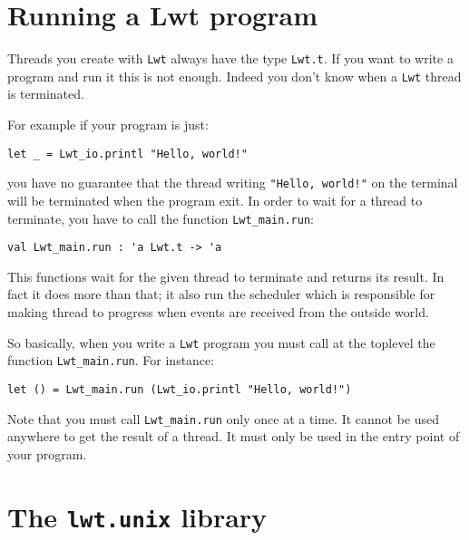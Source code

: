 \section{ Running a Lwt program }

Threads you create with {\tt Lwt} always have the type
{\tt Lwt.t}. If you want to write a program and run it this is not
enough. Indeed you don't know when a {\tt Lwt} thread is terminated.



For example if your program is just:



\lstset{language=[Objective]Caml}\begin{lstlisting}
let _ = Lwt_io.printl "Hello, world!"

\end{lstlisting}
you have no guarantee that the thread writing {\tt "Hello, world!"}
on the terminal will be terminated when the program exit. In order
to wait for a thread to terminate, you have to call the function
{\tt Lwt\_main.run}:



\lstset{language=[Objective]Caml}\begin{lstlisting}
val Lwt_main.run : 'a Lwt.t -> 'a

\end{lstlisting}
This functions wait for the given thread to terminate and returns
its result. In fact it does more than that; it also run the
scheduler which is responsible for making thread to progress when
events are received from the outside world.



So basically, when you write a {\tt Lwt} program you must call at
the toplevel the function {\tt Lwt\_main.run}. For instance:



\lstset{language=[Objective]Caml}\begin{lstlisting}
let () = Lwt_main.run (Lwt_io.printl "Hello, world!")

\end{lstlisting}
Note that you must call {\tt Lwt\_main.run} only once at a time. It
cannot be used anywhere to get the result of a thread. It must only
be used in the entry point of your program.



\section{ The {\tt lwt.unix} library }

